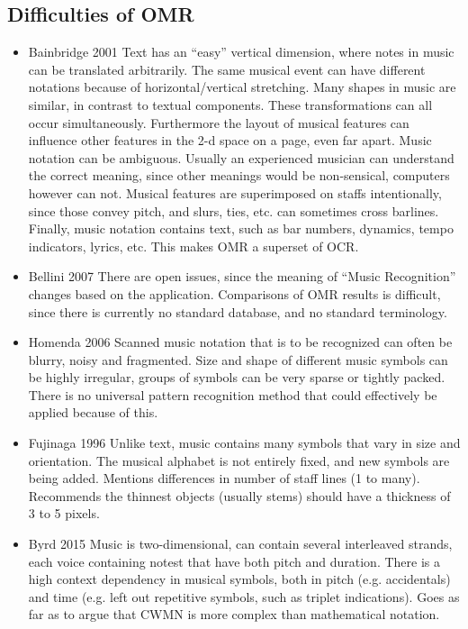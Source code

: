 \subsection{Difficulties of OMR}
\begin{itemize}
    \item Bainbridge 2001 \citep{Bainbridge2001} Text has an ``easy'' vertical dimension, where notes in music can be translated arbitrarily. The same musical event can have different notations because of horizontal/vertical stretching. Many shapes in music are similar, in contrast to textual components. These transformations can all occur simultaneously. Furthermore the layout of musical features can influence other features in the 2-d space on a page, even far apart. Music notation can be ambiguous. Usually an experienced musician can understand the correct meaning, since other meanings would be non-sensical, computers however can not. Musical features are superimposed on staffs intentionally, since those convey pitch, and slurs, ties, etc. can sometimes cross barlines. Finally, music notation contains text, such as bar numbers, dynamics, tempo indicators, lyrics, etc. This makes OMR a superset of OCR.
    \item Bellini 2007 \citep{Bellini2007} There are open issues, since the meaning of ``Music Recognition'' changes based on the application. Comparisons of OMR results is difficult, since there is currently no standard database, and no standard terminology.
    \item Homenda 2006 \citep{Homenda2006} Scanned music notation that is to be recognized can often be blurry, noisy and fragmented. Size and shape of different music symbols can be highly irregular, groups of symbols can be very sparse or tightly packed. There is no universal pattern recognition method that could effectively be applied because of this.
    \item Fujinaga 1996 \citep{Fujinaga1996} Unlike text, music contains many symbols that vary in size and orientation. The musical alphabet is not entirely fixed, and new symbols are being added. Mentions differences in number of staff lines (1 to many). Recommends the thinnest objects (usually stems) should have a thickness of 3 to 5 pixels.
    \item Byrd 2015 \citep{Byrd2015} Music is two-dimensional, can contain several interleaved strands, each voice containing notest that have both pitch and duration. There is a high context dependency in musical symbols, both in pitch (e.g. accidentals) and time (e.g. left out repetitive symbols, such as triplet indications). Goes as far as to argue that CWMN is more complex than mathematical notation.
\end{itemize}

